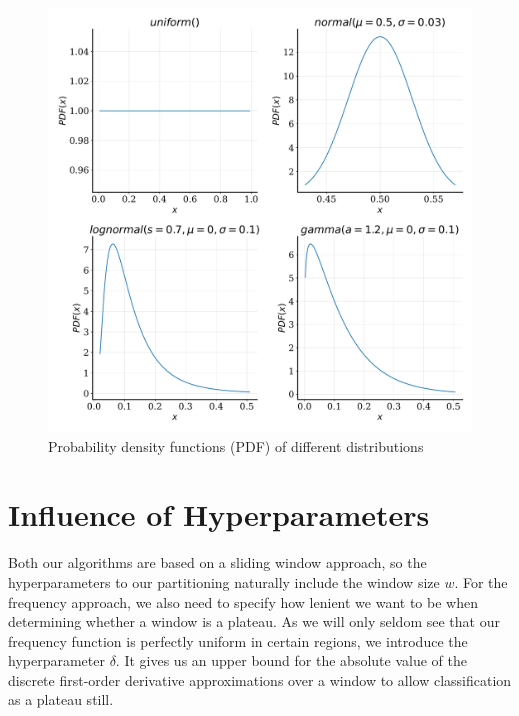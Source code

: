 \begin{figure}
    \centering
    \includegraphics[width=\textwidth]{figures/distributions.pdf}
    \caption{Probability density functions (PDF) of different distributions}
    \label{fig:distributions}
\end{figure}

\section{Influence of Hyperparameters}\label{sec:respartitions}
Both our algorithms are based on a sliding window approach, so the hyperparameters to our partitioning naturally include the window size $w$. For the frequency approach, we also need to specify how lenient we want to be when determining whether a window is a plateau. As we will only seldom see that our frequency function is perfectly uniform in certain regions, we introduce the hyperparameter $\delta$. It gives us an upper bound for the absolute value of the discrete first-order derivative approximations over a window to allow classification as a plateau still. 

